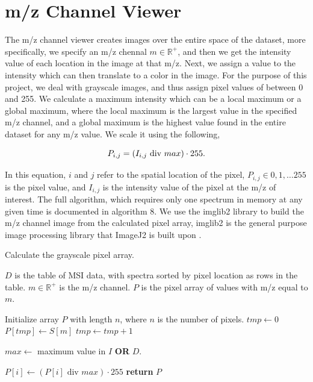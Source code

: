 \documentclass[11pt,openany]{book}
\begin{document}
\section{m/z Channel Viewer}
The m/z channel viewer creates images over the entire space of the dataset, more specifically, we specify an m/z chennal $m \in \mathbb{R}^{+}$, and then we get the intensity value of each location in the image at that m/z. Next, we assign a value to the intensity which can then translate to a color in the image. For the purpose of this project, we deal with grayscale images, and thus assign pixel values of between 0 and 255. We calculate a maximum intensity which can be a local maximum or a global maximum, where the local maximum is the largest value in the specified m/z channel, and a global maximum is the highest value found in the entire dataset for any m/z value. We scale it using the following,

\begin{equation}
    \centering
    \label{eqn:scale_pixel_value}
    P_{i,j} = (I_{i,j} \text{ div } max) \cdot 255.
\end{equation}

In this equation, $i$ and $j$ refer to the spatial location of the pixel, $P_{i,j} \in {0, 1, \dots 255}$ is the pixel value, and $I_{i,j}$ is the intensity value of the pixel at the m/z of interest. The full algorithm, which requires only one spectrum in memory at any given time is documented in algorithm 8. We use the imglib2 library to build the m/z channel image from the calculated pixel array, imglib2 is the general purpose image processing library that ImageJ2 is built upon \cite{imglib2}.

\begin{algorithm}
    \caption{Calculate the grayscale pixel array.}
    \begin{algorithmic}
        \Require $D$ is the table of MSI data, with spectra sorted by pixel location as rows in the table. $m \in \mathbb{R}^{+}$ is the m/z channel.
        \Ensure $P$ is the pixel array of values with m/z equal to $m$.
           
            \State Initialize array $P$ with length $n$, where $n$ is the number of pixels.
            \State $tmp \gets 0$
                \State $P[tmp] \gets S[m]$
                \State $tmp \gets tmp + 1$
            \EndFor
            
            \State $max \gets $ maximum value in $I$ \textbf{OR} $D$.
            
                \State $P[i] \gets (P[i] \text{ div } max) \cdot 255$
            \EndFor
            \State \textbf{return} $P$
        \EndProcedure
        \end{algorithmic}
        \label{alg:calculate_intensity_array_for_mz_image}
    \end{algorithm}
    
\end{document}
